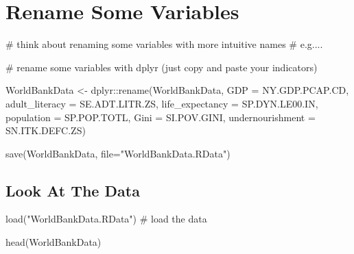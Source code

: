 \documentclass[
  letterpaper,
  DIV=11,
  numbers=noendperiod,
  oneside]{scrreprt}
\newenvironment{Shaded}{\begin{snugshade}}{\end{snugshade}}
\newcommand{\AttributeTok}[1]{\textcolor[rgb]{0.40,0.45,0.13}{#1}}
\newcommand{\CommentTok}[1]{\textcolor[rgb]{0.37,0.37,0.37}{#1}}
\newcommand{\FunctionTok}[1]{\textcolor[rgb]{0.28,0.35,0.67}{#1}}
\newcommand{\NormalTok}[1]{\textcolor[rgb]{0.00,0.23,0.31}{#1}}
\newcommand{\OtherTok}[1]{\textcolor[rgb]{0.00,0.23,0.31}{#1}}
\newcommand{\SpecialCharTok}[1]{\textcolor[rgb]{0.37,0.37,0.37}{#1}}
\newcommand{\StringTok}[1]{\textcolor[rgb]{0.13,0.47,0.30}{#1}}
\begin{document}
\chapter{Rename Some Variables}\label{rename-some-variables}

\begin{Shaded}
\begin{Highlighting}[]
\CommentTok{\# think about renaming some variables with more intuitive names}
\CommentTok{\# e.g....}

\CommentTok{\# rename some variables with dplyr (just copy and paste your indicators)}

\NormalTok{WorldBankData }\OtherTok{\textless{}{-}}\NormalTok{ dplyr}\SpecialCharTok{::}\FunctionTok{rename}\NormalTok{(WorldBankData, }
                        \AttributeTok{GDP =}\NormalTok{ NY.GDP.PCAP.CD,}
                        \AttributeTok{adult\_literacy =}\NormalTok{ SE.ADT.LITR.ZS,}
                        \AttributeTok{life\_expectancy =}\NormalTok{ SP.DYN.LE00.IN, }
                        \AttributeTok{population =}\NormalTok{ SP.POP.TOTL,}
                        \AttributeTok{Gini =}\NormalTok{ SI.POV.GINI,}
                        \AttributeTok{undernourishment =}\NormalTok{ SN.ITK.DEFC.ZS)}

\FunctionTok{save}\NormalTok{(WorldBankData, }\AttributeTok{file=}\StringTok{"WorldBankData.RData"}\NormalTok{)}
\end{Highlighting}
\end{Shaded}

\section{Look At The Data}\label{look-at-the-data}

\begin{Shaded}
\begin{Highlighting}[]
\FunctionTok{load}\NormalTok{(}\StringTok{"WorldBankData.RData"}\NormalTok{) }\CommentTok{\# load the data}

\FunctionTok{head}\NormalTok{(WorldBankData)}
\end{Highlighting}
\end{Shaded}
\end{document}
